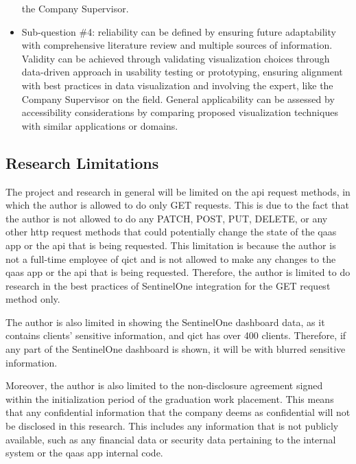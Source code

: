 \begin{multicols}{2}
\begin{itemize}[label=-]
                  the Company Supervisor.
            \item Sub-question \#4: reliability can be defined by ensuring future adaptability with comprehensive
                  literature review and multiple sources of information. Validity can be achieved through validating
                  visualization choices through data-driven approach in usability testing or  prototyping, ensuring
                  alignment with best practices in data visualization and involving the expert, like the Company
                  Supervisor on the field. General applicability can be assessed by accessibility considerations by
                  comparing proposed visualization techniques with similar applications or domains.
      \end{itemize}
      \subsection{Research Limitations}
      The project and research in general will be limited on the \acrshort{api} request methods, in which the author
      is allowed to do only GET requests. This is due to the fact that the author is not allowed to do any PATCH,
      POST, PUT, DELETE, or any other \acrshort{http} request methods that could potentially change the state of the
      \acrshort{qaas} app or the \acrshort{api} that is being requested. This limitation is because the author is not a
      full-time employee of \acrshort{qict} and is not allowed to make any changes to the \acrshort{qaas} app or the
      \acrshort{api} that is being requested. Therefore, the author is limited to do research in the best practices
      of SentinelOne integration for the GET request method only.

      The author is also limited in showing the SentinelOne dashboard data, as it contains clients' sensitive
      information, and \acrshort{qict} has over 400 clients. Therefore, if any part of the SentinelOne dashboard is
      shown, it will be with blurred sensitive information.

      Moreover, the author is also limited to the non-disclosure agreement signed within the initialization period of
      the graduation work placement. This means that any confidential information that the company deems as confidential
      will not be disclosed in this research. This includes any information that is not publicly available, such as any
      financial data or security data pertaining to the internal system or the \acrshort{qaas} app internal code.

\end{multicols}
